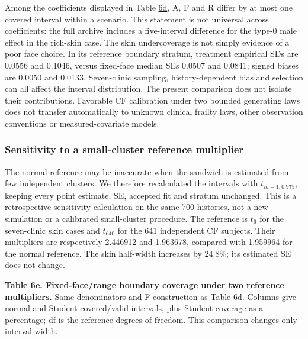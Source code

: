 \documentclass[11pt]{article}
\begin{document}
Among the coefficients displayed in Table \hyperref[tab:6d]{6d}, A, F and R differ by at most one covered interval within a scenario. This statement is not universal across coefficients: the full archive includes a five-interval difference for the type-0 male effect in the rich-skin case. The skin undercoverage is not simply evidence of a poor face choice. In its reference boundary stratum, treatment empirical SDs are 0.0556 and 0.1046, versus fixed-face median SEs 0.0507 and 0.0841; signed biases are 0.0050 and 0.0133. Seven-clinic sampling, history-dependent bias and selection can all affect the interval distribution. The present comparison does not isolate their contributions. Favorable CF calibration under two bounded generating laws does not transfer automatically to unknown clinical frailty laws, other observation conventions or measured-covariate models.

\subsubsection{Sensitivity to a small-cluster reference multiplier}\label{sec:6.8.2}

The normal reference may be inaccurate when the sandwich is estimated from few independent clusters. We therefore recalculated the intervals with \(t_{m-1,0.975}\), keeping every point estimate, SE, accepted fit and stratum unchanged. This is a retrospective sensitivity calculation on the same 700 histories, not a new simulation or a calibrated small-cluster procedure. The reference is \(t_6\) for the seven-clinic skin cases and \(t_{640}\) for the 641 independent CF subjects. Their multipliers are respectively 2.446912 and 1.963678, compared with 1.959964 for the normal reference. The skin half-width increases by 24.8\%; its estimated SE does not change.

\label{tab:6e}
\textbf{Table 6e. Fixed-face/range boundary coverage under two reference multipliers.} Same denominators and F construction as Table \hyperref[tab:6d]{6d}. Columns give normal and Student covered/valid intervals, plus Student coverage as a percentage; df is the reference degrees of freedom. This comparison changes only interval width.
\end{document}
